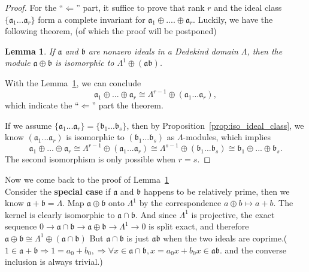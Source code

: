 \documentclass[11pt]{article}
\newtheorem{lemma}[thm]{Lemma}
\newcommand{\sca}{{\mathfrak a}}
\newcommand{\scb}{{\mathfrak b}}
\newcommand{\rta}{\rightarrow}
\newcommand{\Lrta}{\Longrightarrow}
\newcommand{\Llta}{\Longleftarrow}
\begin{document}
\begin{proof}
For the ``$\Llta$'' part, it suffice to prove that rank $r$ and the ideal class $\{\sca_1...\sca_r\}$ form a complete invariant for $\sca_1\oplus....\oplus \sca_r$. Luckily, we have the following theorem, (of which the proof will be postponed) 
\begin{lemma}\label{lem:ideal_sum}
If $\sca$ and $\scb$ are nonzero ideals in a Dedekind domain $\Lambda$, then the module $\sca\oplus\scb$ is isomorphic to $\Lambda^1\oplus(\sca\scb)$.
\end{lemma}
With the Lemma~\ref{lem:ideal_sum}, we can conclude
$$
\sca_1\oplus...\oplus \sca_r\cong \Lambda^{r-1}\oplus(\sca_1...\sca_r),
$$
which indicate the ``$\Llta$'' part the theorem.

If we assume 
$\{\sca_1...\sca_r\}=\{\scb_1...\scb_s\}$, then by Proposition~\ref{prop:iso_ideal_class}, we know $(\sca_1...\sca_r)$ is isomorphic to $(\scb_1...\scb_s)$ as $\Lambda$-modules, which implies
$$
\sca_1\oplus...\oplus \sca_r\cong \Lambda^{r-1}\oplus(\sca_1...\sca_r)\cong \Lambda^{s-1}\oplus(\scb_1...\scb_s)\cong \scb_1\oplus...\oplus\scb_s.
$$
The second isomorphism is only possible when $r=s$.
\end{proof}
Now we come back to the proof of Lemma~\ref{lem:ideal_sum}\\
Consider the \textbf{special case} if $\sca$ and $\scb$ happens to be relatively prime, then we know $\sca+\scb=\Lambda$. Map $\sca\oplus \scb$ onto $\Lambda^1$ by the correspondence $a\oplus b\mapsto a+b$. The kernel is clearly isomorphic to $\sca\cap\scb$. And since $\Lambda^1$ is projective, the exact sequence $0\rta\sca\cap\scb\rta\sca\oplus\scb\rta\Lambda^1\rta0$ is split exact, and therefore $\sca\oplus\scb\cong \Lambda^1\oplus(\sca\cap\scb)$
But $\sca\cap\scb$ is just $\sca\scb$ when the two ideals are coprime.($1\in\sca+\scb\Lrta 1=a_0+b_0,\Lrta \forall x\in \sca\cap\scb, x=a_0x+b_0x\in \sca\scb. $ and the converse inclusion is always trivial.)
\end{document}
